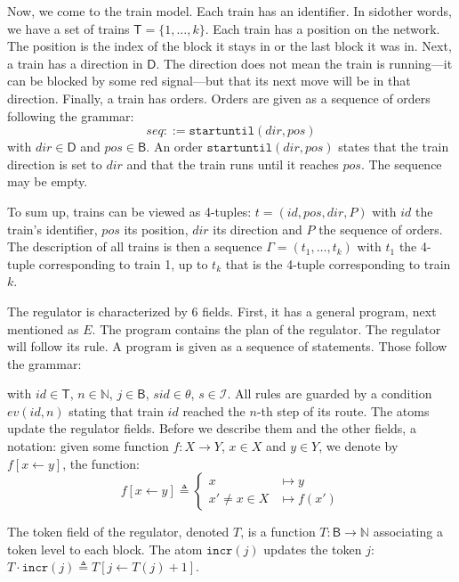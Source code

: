 \documentclass[runningheads]{llncs}
\newcommand{\Nat}{{\mbox{$\mathbb{N}$}}}
\newcommand{\directions}{{\mathsf{D}}}
\newcommand{\turnouts}{{\mathsf{\theta}}}
\newcommand{\blocks}{{\mathsf{B}}}
\newcommand{\internalState}{{\mathcal{I}}}
\newcommand{\incr}{{\mbox{$\mathtt{incr}$}}\xspace}
\newcommand{\turn}{{\mbox{$\mathtt{turn}$}}\xspace}
\newcommand{\su}{{\mbox{$\mathtt{startuntil}$}}\xspace}
\newcommand{\trains}{{\mathsf{T}}}
\begin{document}
Now, we come to the train model. Each train has an identifier. In sidother words, we have a set of trains $\trains = \{1, \ldots, k\}$. Each train has a position on the network. The position is the index of the block it stays in or the last block it was in. Next, a train has a direction in $\directions$. The direction does not mean the train is running---it can be blocked by some red signal---but that its next move will be in that direction. Finally, a train has orders. Orders are given as a sequence of orders following the grammar:
$$  seq ::= \su(dir,pos) $$
with $dir \in \directions$ and $pos \in \blocks$. An order $\su(dir, pos)$ states that the train direction is set to $dir$ and that the train runs until it reaches $pos$.  The sequence may be empty. 

To sum up, trains can be viewed as 4-tuples: $t = (id, pos, dir, P)$ with $id$ the train's identifier, $pos$ its position, $dir$ its direction and $P$ the sequence of orders. The description of all trains is then a sequence $\Gamma = (t_1, \ldots, t_k)$ with $t_1$ the 4-tuple corresponding to train 1, up to $t_k$ that is the 4-tuple corresponding to train $k$. 

The regulator is characterized by 6 fields. First, it has a general program, next mentioned as $E$. The program contains the plan of the regulator. The regulator will follow its rule. A program is given as a sequence of statements. Those follow the grammar:

\begin{grammar}
    \firstcasesubtil{atoms}{\incr(j)}{}
    \otherform{\turn(sid, s)}{}
    \otherform{\varepsilon}{}
\end{grammar}
with $id \in \trains$, $n \in  \Nat$, $j \in \blocks$, $sid \in \turnouts$, $s\in \internalState$.  All rules are guarded by a condition $ev(id,n)$ stating that train $id$ reached the $n$-th step of its route. The atoms update the regulator fields. Before we describe them and the other fields, a notation: given some function $f: X \to Y$, $x \in X$ and $y \in Y$, we denote by $f[x \leftarrow y]$, the function:
 $$f[x \leftarrow y] \triangleq \left\{  \begin{array}{ll} x &\mapsto y\\
x' \neq x \in X &\mapsto f(x')
\end{array}\right.$$

The token field of the regulator, denoted $T$, is a function  $T: \blocks \to \Nat$ associating a token level to each block.  The atom $\incr(j)$ updates the token $j$:  $T \cdot \incr(j)  \triangleq T[j \leftarrow T(j)+1]$.
\end{document}
